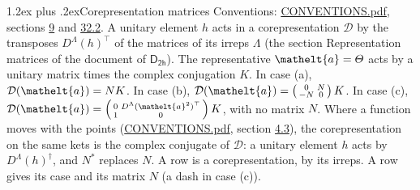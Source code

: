 \documentclass[10pt,a4paper]{article}
\makeatletter
\renewcommand\section{\@startsection{section}{1}{\z@}{-3ex plus -1ex minus -.2ex}%
  {1.2ex plus .2ex}{\normalfont\large\sffamily\bfseries\color{parttitle}}}
\numberwithin{equation}{section}
\newcommand{\eltfont}[1]{{\let\sigma\eltsigma\mathelt{#1}}}
\newcommand{\grp}[1]{\mathsf{#1}}
\newcommand{\elt}[1]{\eltfont{#1}}
\makeatother
\begin{document}
\section{Corepresentation matrices}\label{s:corep_matrices}
Conventions: \href{../../CONVENTIONS.pdf}{CONVENTIONS.pdf}, sections \href{../../../rotation/CONVENTIONS.pdf\#conv.9}{9} and \href{../../CONVENTIONS.pdf\#conv.32.2}{32.2}.
A unitary element $h$ acts in a corepresentation $\mathcal{D}$ by the transposes $D^{\Lambda}(h)^{\top}$ of the matrices of its irreps $\Lambda$ (the section Representation matrices of the document of \href{../../../rotation/data/pdf/D2h.pdf}{$\grp{D_{2h}}$}). The representative $\elt{a} = \varTheta$ acts by a unitary matrix times the complex conjugation $K$.
In case (a), $\mathcal{D}(\elt{a}) = NK$. In case (b), $\mathcal{D}(\elt{a}) = \left(\begin{smallmatrix} 0 & N \\ -N & 0 \end{smallmatrix}\right) K$. In case (c), $\mathcal{D}(\elt{a}) = \left(\begin{smallmatrix} 0 & D^{\Lambda}(\elt{a}^2)^{\top} \\ 1 & 0 \end{smallmatrix}\right) K$, with no matrix $N$.
Where a function moves with the points (\href{../../CONVENTIONS.pdf}{CONVENTIONS.pdf}, section \href{../../../rotation/CONVENTIONS.pdf\#conv.4.3}{4.3}), the corepresentation on the same kets is the complex conjugate of $\mathcal{D}$: a unitary element $h$ acts by $D^{\Lambda}(h)^{\dagger}$, and $N^{*}$ replaces $N$.
A row is a corepresentation, by its irreps. A row gives its case and its matrix $N$ (a dash in case (c)).
\end{document}

